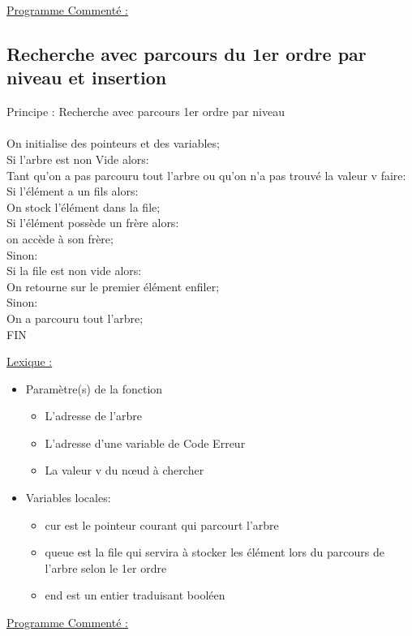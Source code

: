 \documentclass[a4paper]{article}
\newcommand\tab[1][1cm]{\hspace*{#1}}
\begin{document}
\underline{Programme Commenté :}



\subsection{Recherche avec parcours du 1er ordre par niveau et insertion }
\begin{algorithm}
Principe : Recherche avec parcours 1er ordre par niveau
\\
\\
\tab On initialise des pointeurs et des variables;
\\
\tab Si l'arbre est non Vide alors:
\\
\tab \tab Tant qu'on a pas parcouru tout l'arbre ou qu'on n'a pas trouvé la valeur v faire:
\\
\tab \tab \tab Si l'élément a un fils alors:
\\
\tab \tab \tab \tab On stock l'élément dans la file;
\\
\tab \tab \tab Si l'élément possède un frère alors:
\\
\tab \tab \tab \tab on accède à son frère;
\\
\tab \tab \tab Sinon:
\\
\tab \tab \tab \tab Si la file est non vide alors:
\\
\tab \tab \tab \tab \tab On retourne sur le premier élément enfiler;
\\
\tab \tab \tab \tab Sinon:
\\
\tab \tab \tab \tab \tab On a parcouru tout l'arbre;
\\
FIN
\end{algorithm}
\underline{Lexique :}
\begin{itemize}
\item Paramètre(s) de la fonction  
\begin{itemize}
\item L'adresse de l'arbre
\item L'adresse d'une variable de Code Erreur
\item La valeur v du nœud à chercher
\end{itemize}
\item Variables locales:
\begin{itemize}
\item cur est le pointeur courant qui parcourt l'arbre
\item queue est la file qui servira à stocker les élément lors du parcours de l'arbre selon le 1er ordre 
\item end est un entier traduisant booléen
\end{itemize}
\end{itemize}
\underline{Programme Commenté :}
\end{document}
